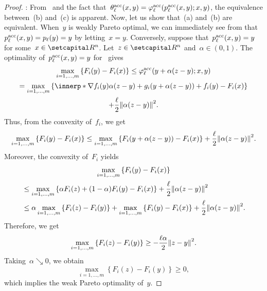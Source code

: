 \documentclass[../main]{subfiles}
\begin{document}
\begin{proof}
    : From~ and the fact that~$\theta^{\mathrm{acc}}_\ell(x, y) = \varphi^{\mathrm{acc}}_\ell(p^{\mathrm{acc}}_\ell(x, y); x, y)$, the equivalence between~(b) and~(c) is apparent.
    Now, let us show that~(a) and~(b) are equivalent.
    When~$y$ is weakly Pareto optimal, we can immediately see from  that~$p^{\mathrm{acc}}_\ell(x, y) = p_\ell(y) = y$ by letting~$x = y$.
    Conversely, suppose that~$p^{\mathrm{acc}}_\ell(x, y) = y$ for some~$x \in \setR^n$.
    Let~$z \in \setR^n$ and~$\alpha \in (0, 1)$.
    The optimality of~$p^{\mathrm{acc}}_\ell(x, y) = y$ for~ gives
    \begin{multline}
        \max_{i = 1, \dots, m} \left\{ F_i(y) - F_i(x) \right\} \le \varphi^\acc_\ell(y + \alpha (z - y); x, y) \\
        = \max_{i = 1, \dots, m} \left\{ \innerp*{\nabla f_i(y)}{\alpha (z - y)} + g_i(y + \alpha (z - y)) + f_i(y) - F_i(x) \right\} \\
        + \frac{\ell}{2} \norm*{\alpha (z - y)}^2
    .\end{multline}
    Thus, from the convexity of~$f_i$, we get
    \begin{equation}
            \max_{i = 1, \dots, m}\left\{ F_i(y) - F_i(x) \right\} \le \max_{i = 1, \dots, m}\left\{ F_i(y + \alpha (z - y)) - F_i(x) \right\} + \frac{\ell}{2} \norm*{\alpha (z - y)}^2
    .\end{equation}
    Moreover, the convexity of~$F_i$ yields
    \begin{multline}
        \max_{i = 1, \dots, m}\left\{ F_i(y) - F_i(x) \right\} \\
        \begin{split}
        &\le \max_{i = 1, \dots, m}\left\{  \alpha F_i(z) + (1 - \alpha) F_i(y) - F_i(x)  \right\} + \frac{\ell}{2} \norm*{\alpha (z - y) }^2 \\
        &\le \alpha \max_{i = 1, \dots, m}\left\{  F_i(z) - F_i(y) \right\} + \max_{i = 1, \dots, m}\left\{ F_i(y) - F_i(x)  \right\} + \frac{\ell}{2} \norm*{\alpha (z - y) }^2
        .\end{split}
    \end{multline}
    Therefore, we get
    \begin{equation}
        \max_{i = 1, \dots, m}\left\{  F_i(z) - F_i(y)  \right\} \ge - \frac{\ell \alpha}{2} \norm*{z - y }^2
    .\end{equation}
    Taking~$\alpha \searrow 0$, we obtain
    \begin{equation}
        \max_{i = 1, \dots, m}\left\{  F_i(z) - F_i(y)  \right\} \ge 0
    ,\end{equation}
    which implies the weak Pareto optimality of~$y$.


\end{proof}
\end{document}
